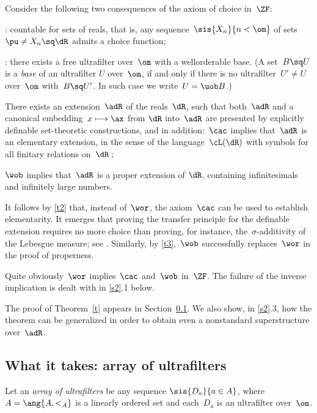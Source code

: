 \documentclass[11pt,
]{article}
\begin{document}
Consider the following two consequences of the axiom of 
choice in~$\ZF$: 
\bde
\item[\cac:] countable \AC{} for sets of reals, 
that is, any sequence~$\sis{X_n}{n<\om}$ 
of sets~$\pu\ne X_n\sq \dR$ admits a
choice function;

\item[\wob:] there exists a free ultrafilter over~$\om$ with a
wellorderable base.  (A set~$B\sq U$ is a {\it base} of an ultrafilter
$U$ over~$\om$, if and only if there is no ultrafilter~$U'\ne U$
over~$\om$ with~$B\sq U'$.  In such case we write~$U=\uob B$.)
%
\ede

\bte[$\ZF$]
\label{t}
There exists an extension\/~$\adR$ of the reals\/~$\dR$, such that
both\/~$\adR$ and a canonical embedding\/~$x\longmapsto \ax$ from\/
$\dR$ into\/~$\adR$ are presented by explicitly definable
set-theoretic constructions, and in addition$:$ \ben \renu {}
$\cac$ implies that\/~$\adR$ is an elementary extension, in the sense
of the language\/~$\cL(\dR)$ with symbols for all finitary relations
on\/~$\dR\;;$

$\wob$ implies that\/~$\adR$ is a proper extension of\/ 
$\dR$, 
containing infinitesimals and infinitely 
large numbers.
\een
\ete

It follows by \ref{t2} that, instead of~$\wor$, the axiom~$\cac$ can
be used to establish elementarity.  It emerges that proving the
transfer principle for the definable extension requires no more choice
than proving, for instance, the~$\sigma$-additivity of the Lebesgue
measure; see \cite{KK}.  Similarly, by \ref{t3},~$\wob$ successfully
replaces~$\wor$ in the proof of properness.

Quite obviously~$\wor$ implies~$\cac$ and~$\wob$ in~$\ZF$.  The
failure of the inverse implication is dealt with in \ref{s2}.1 below.

The proof of Theorem~\ref{t} appears in Section~\ref{s1}.  We also
show, in \ref{s2}.3, how the theorem can be generalized in order to
obtain even a nonstandard superstructure over~$\adR$.


\subsection{What it takes: array of ultrafilters}
\label{s1}

Let an {\it array of ultrafilters\/} be any sequence 
$\sis{D_a}{a\in A}$, where~$A=\ang{A,<_A}$ is a 
linearly ordered set and each~$D_a$ is an ultrafilter 
over~$\om$. 
\end{document}
